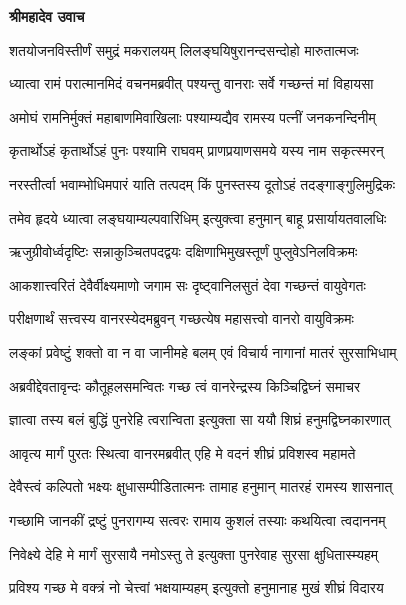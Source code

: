 




\textbf{श्रीमहादेव उवाच}

\twolineshloka
{शतयोजनविस्तीर्णं समुद्रं मकरालयम्}
{लिलङ्घयिषुरानन्दसन्दोहो मारुतात्मजः} %

\twolineshloka
{ध्यात्वा रामं परात्मानमिदं वचनमब्रवीत्}
{पश्यन्तु वानराः सर्वे गच्छन्तं मां विहायसा} %

\twolineshloka
{अमोघं रामनिर्मुक्तं महाबाणमिवाखिलाः}
{पश्याम्यद्यैव रामस्य पत्नीं जनकनन्दिनीम्} %

\twolineshloka
{कृतार्थोऽहं कृतार्थोऽहं पुनः पश्यामि राघवम्}
{प्राणप्रयाणसमये यस्य नाम सकृत्स्मरन्} %

\twolineshloka
{नरस्तीर्त्वा भवाम्भोधिमपारं याति तत्पदम्}
{किं पुनस्तस्य दूतोऽहं तदङ्गाङ्गुलिमुद्रिकः} %

\twolineshloka
{तमेव हृदये ध्यात्वा लङ्घयाम्यल्पवारिधिम्}
{इत्युक्त्वा हनुमान् बाहू प्रसार्यायतवालधिः} %

\twolineshloka
{ऋजुग्रीवोर्ध्वदृष्टिः सन्नाकुञ्चितपदद्वयः}
{दक्षिणाभिमुखस्तूर्णं पुप्लुवेऽनिलविक्रमः} %

\twolineshloka
{आकशात्त्वरितं देवैर्वीक्ष्यमाणो जगाम सः}
{दृष्ट्वानिलसुतं देवा गच्छन्तं वायुवेगतः} %

\twolineshloka
{परीक्षणार्थं सत्त्वस्य वानरस्येदमब्रुवन्}
{गच्छत्येष महासत्त्वो वानरो वायुविक्रमः} %

\twolineshloka
{लङ्कां प्रवेष्टुं शक्तो वा न वा जानीमहे बलम्}
{एवं विचार्य नागानां मातरं सुरसाभिधाम्} %

\twolineshloka
{अब्रवीद्देवतावृन्दः कौतूहलसमन्वितः}
{गच्छ त्वं वानरेन्द्रस्य किञ्चिद्विघ्नं समाचर} %

\twolineshloka
{ज्ञात्वा तस्य बलं बुद्धिं पुनरेहि त्वरान्विता}
{इत्युक्ता सा ययौ शिघ्रं हनुमद्विघ्नकारणात्} %

\twolineshloka
{आवृत्य मार्गं पुरतः स्थित्वा वानरमब्रवीत्}
{एहि मे वदनं शीघ्रं प्रविशस्व महामते} %

\twolineshloka
{देवैस्त्वं कल्पितो भक्ष्यः क्षुधासम्पीडितात्मनः}
{तामाह हनुमान् मातरहं रामस्य शासनात्} %

\twolineshloka
{गच्छामि जानकीं द्रष्टुं पुनरागम्य सत्वरः}
{रामाय कुशलं तस्याः कथयित्वा त्वदाननम्} %

\twolineshloka
{निवेक्ष्ये देहि मे मार्गं सुरसायै नमोऽस्तु ते}
{इत्युक्ता पुनरेवाह सुरसा क्षुधितास्म्यहम्} %

\twolineshloka
{प्रविश्य गच्छ मे वक्त्रं नो चेत्त्वां भक्षयाम्यहम्}
{इत्युक्तो हनुमानाह मुखं शीघ्रं विदारय} %

